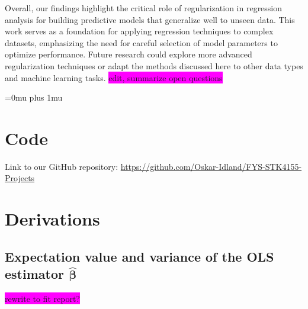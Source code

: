 \documentclass[aps,pra,english,notitlepage,reprint,nofootinbib]{revtex4-1}  %
\begin{document}
Overall, our findings highlight the critical role of regularization in regression analysis for building predictive models that generalize well to unseen data. This work serves as a foundation for applying regression techniques to complex datasets, emphasizing the need for careful selection of model parameters to optimize performance. Future research could explore more advanced regularization techniques or adapt the methods discussed here to other data types and machine learning tasks. \colorbox{magenta}{edit, summarize open questions}



\Urlmuskip=0mu plus 1mu\relax
\onecolumngrid


\newpage
\newpage
\appendix
\section{Code}\label{appsec:code}
Link to our GitHub repository: \href{https://github.com/Oskar-Idland/FYS-STK4155-Projects}{https://github.com/Oskar-Idland/FYS-STK4155-Projects}

\section{Derivations}\label{appsec:derivations}
\subsection{Expectation value and variance of the OLS estimator \texorpdfstring{$\boldsymbol{\hat{\beta}}$}{Lg}}\label{subapp:beta OLS}
\colorbox{magenta}{rewrite to fit report?}
\end{document}
